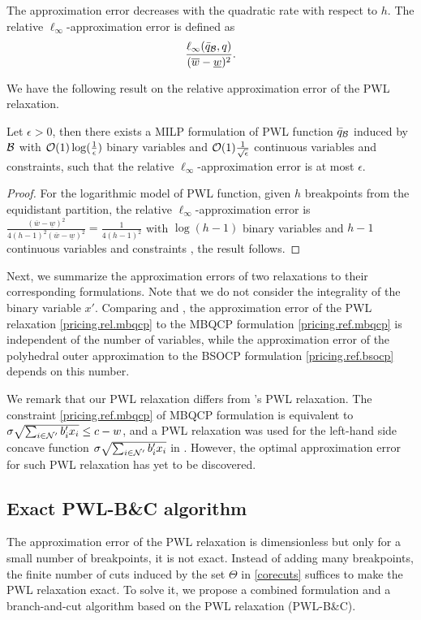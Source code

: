 The approximation error decreases with the quadratic rate with respect to \(h\). The relative \(\ell_\infty\)-approximation error is defined as $$\frac{\ell_\infty(\bar{q}_{\mathcal B}, q)}{(  \overline{w} - \underline{w})^2}.$$

We have the following result on the relative approximation error of the PWL relaxation.
\begin{corollary}
\label{cor.pout}
Let \(\epsilon > 0\), then there exists a MILP formulation of PWL function $\bar{q}_{\mathcal B}$ induced by $\mathcal B$ with \({\mathcal{O}(1)}\log(\frac{1}{\epsilon})\)  binary variables and \({\mathcal{O}(1)}\frac{1}{\sqrt{\epsilon}}\)  continuous variables and constraints, such that the relative $\ell_\infty$-approximation error is at most \( \epsilon\).
\end{corollary}
\begin{proof}
For the logarithmic model of PWL function, given $h$ breakpoints from the equidistant partition, the relative \(\ell_\infty\)-approximation error is $\frac{(\overline{w} - \underline{w})^2}{4(h-1)^2(\overline{w} - \underline{w})^2}=\frac{1}{4(h-1)^2}$ with $\log(h-1)$ binary variables and $h-1$ continuous variables and constraints \citep{vielma2010}, the result follows.
 \end{proof}

Next, we summarize the approximation errors of two relaxations to their corresponding formulations. Note that we do not consider the integrality of the binary variable $x'$. Comparing  and , the approximation error of the PWL relaxation \eqref{pricing.rel.mbqcp} to the MBQCP formulation \eqref{pricing.ref.mbqcp} is independent of the number of variables, while the approximation error of the polyhedral outer approximation to the BSOCP formulation \eqref{pricing.ref.bsocp} depends on this number.

We remark that our PWL relaxation differs from \cite{shylo2013}'s PWL relaxation. The constraint \eqref{pricing.ref.mbqcp} of MBQCP formulation is equivalent to $\sigma \sqrt{\sum_{i \in \mathcal N'} b'_i x_i}  \le c -w$, and a  PWL relaxation was used for  the left-hand side concave function $\sigma \sqrt{\sum_{i \in \mathcal N'} b'_i x_i}$  in \cite{shylo2013}. However, the optimal approximation error for such PWL relaxation has yet to be discovered.




\subsection{Exact PWL-B\&C algorithm}
\label{sec.pwl}
The approximation error of the PWL relaxation is dimensionless but only for a small number of breakpoints, it is not exact. Instead of adding many breakpoints, the finite number of cuts induced by the set $\Theta$ in \eqref{corecuts} suffices to make the PWL relaxation exact. To solve it, we propose a combined formulation and a branch-and-cut algorithm based on the PWL relaxation (PWL-B\&C).

